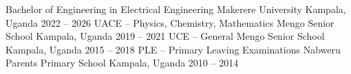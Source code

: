 
    \begin{cventries}
      \cventry
        {Bachelor of Engineering in Electrical Engineering}
        {Makerere University}
        {Kampala, Uganda}
        {2022 -- 2026}
        {}
      \cventry
        {UACE – Physics, Chemistry, Mathematics}
        {Mengo Senior School}
        {Kampala, Uganda}
        {2019 -- 2021}
        {}
      \cventry
        {UCE – General}
        {Mengo Senior School}
        {Kampala, Uganda}
        {2015 -- 2018}
        {}
      \cventry
        {PLE – Primary Leaving Examinations}
        {Nabweru Parents Primary School}
        {Kampala, Uganda}
        {2010 -- 2014}
        {}
    \end{cventries}